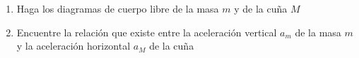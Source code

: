 \documentclass[letterpaper,11pt]{article}
\begin{document}
\begin{enumerate}
\begin{enumerate}
    \item Haga los diagramas de cuerpo libre de la masa $m$ y de la cuña $M$
    
    \item Encuentre la relación que existe entre la aceleración vertical $a_m$ de la masa $m$ y la aceleración horizontal $a_M$ de la cuña
    
\end{enumerate}



%   

\end{enumerate}
\end{document}
